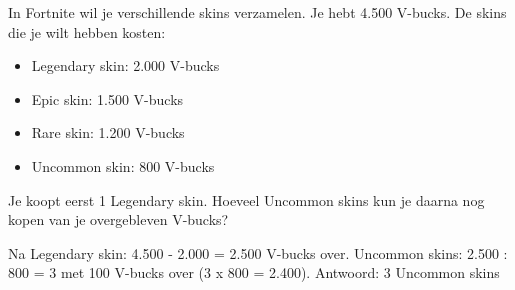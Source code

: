\begin{opgave}
In Fortnite wil je verschillende skins verzamelen. Je hebt 4.500 V-bucks. De skins die je
wilt hebben kosten:

\begin{itemize}
\item Legendary skin: 2.000 V-bucks
\item Epic skin: 1.500 V-bucks  
\item Rare skin: 1.200 V-bucks
\item Uncommon skin: 800 V-bucks
\end{itemize}

Je koopt eerst 1 Legendary skin. Hoeveel Uncommon skins kun je daarna nog kopen van je
overgebleven V-bucks?
\end{opgave}

\begin{oplossing}
Na Legendary skin: 4.500 - 2.000 = 2.500 V-bucks over.
Uncommon skins: 2.500 : 800 = 3 met 100 V-bucks over (3 x 800 = 2.400).
Antwoord: 3 Uncommon skins
\end{oplossing}